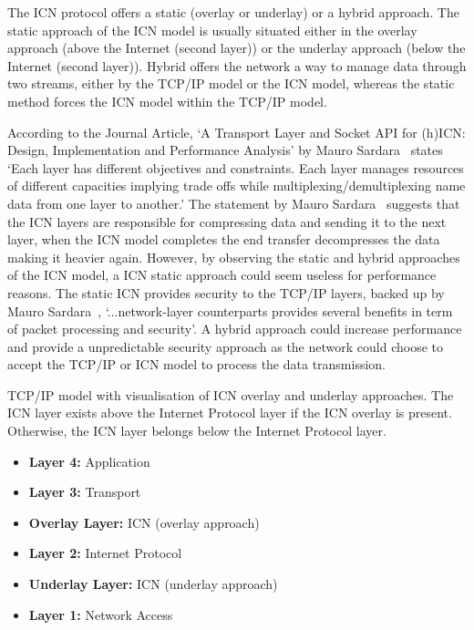 \documentclass[conference]{IEEEtran}
\begin{document}
      The ICN protocol offers a static (overlay or underlay) or a hybrid approach. The static approach of the ICN model is usually situated either in the overlay approach (above the Internet (second layer)) or the underlay approach (below the Internet (second layer)). Hybrid offers the network a way to manage data through two streams, either by the TCP/IP model or the ICN model, whereas the static method forces the ICN model within the TCP/IP model. 
      
      According to the Journal Article, `A Transport Layer and Socket API for (h)ICN: Design, Implementation and Performance Analysis' by Mauro Sardara~\cite{sardara_transport_2018} states `Each layer has different objectives and constraints. Each layer manages resources of different capacities implying trade offs while multiplexing/demultiplexing name data from one layer to another.' The statement by Mauro Sardara~\cite{sardara_transport_2018} suggests that the ICN layers are responsible for compressing data and sending it to the next layer, when the ICN model completes the end transfer decompresses the data making it heavier again. However, by observing the static and hybrid approaches of the ICN model, a ICN static approach could seem useless for performance reasons. The static ICN provides security to the TCP/IP layers, backed up by Mauro Sardara~\cite{sardara_transport_2018}, `...network-layer counterparts provides several benefits in term of packet processing and security'. A hybrid approach could increase performance and provide a unpredictable security approach as the network could choose to accept the TCP/IP or ICN model to process the data transmission.

      TCP/IP model with visualisation of ICN overlay and underlay approaches. The ICN layer exists above the Internet Protocol layer if the ICN overlay is present. Otherwise, the ICN layer belongs below the Internet Protocol layer.
      \begin{itemize}
        \item[] \textbf{Layer 4:} Application
        \item[] \textbf{Layer 3:} Transport
        \item[] \textbf{Overlay Layer:} ICN (overlay approach)
        \item[] \textbf{Layer 2:} Internet Protocol
        \item[] \textbf{Underlay Layer:} ICN (underlay approach)
        \item[] \textbf{Layer 1:} Network Access
      \end{itemize}
\end{document}
